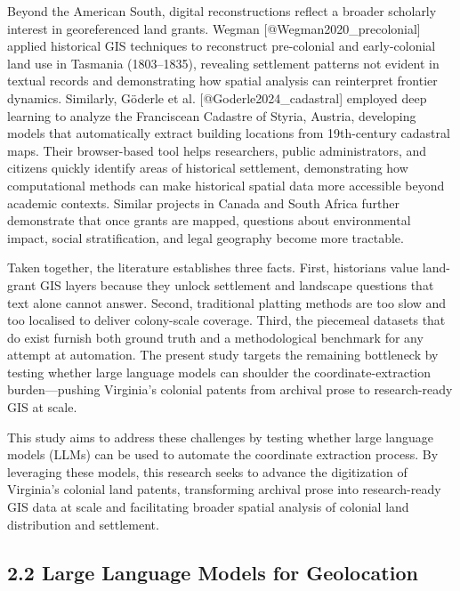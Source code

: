 \documentclass[
  11pt,
]{article}
\begin{document}
Beyond the American South, digital reconstructions reflect a broader
scholarly interest in georeferenced land grants. Wegman
{[}@Wegman2020\_precolonial{]} applied historical GIS techniques to
reconstruct pre-colonial and early-colonial land use in Tasmania
(1803--1835), revealing settlement patterns not evident in textual
records and demonstrating how spatial analysis can reinterpret frontier
dynamics. Similarly, Göderle et al. {[}@Goderle2024\_cadastral{]}
employed deep learning to analyze the Franciscean Cadastre of Styria,
Austria, developing models that automatically extract building locations
from 19th-century cadastral maps. Their browser-based tool helps
researchers, public administrators, and citizens quickly identify areas
of historical settlement, demonstrating how computational methods can
make historical spatial data more accessible beyond academic contexts.
Similar projects in Canada and South Africa further demonstrate that
once grants are mapped, questions about environmental impact, social
stratification, and legal geography become more tractable.

Taken together, the literature establishes three facts. First,
historians value land-grant GIS layers because they unlock settlement
and landscape questions that text alone cannot answer. Second,
traditional platting methods are too slow and too localised to deliver
colony-scale coverage. Third, the piecemeal datasets that do exist
furnish both ground truth and a methodological benchmark for any attempt
at automation. The present study targets the remaining bottleneck by
testing whether large language models can shoulder the
coordinate-extraction burden---pushing Virginia's colonial patents from
archival prose to research-ready GIS at scale.

This study aims to address these challenges by testing whether large
language models (LLMs) can be used to automate the coordinate extraction
process. By leveraging these models, this research seeks to advance the
digitization of Virginia's colonial land patents, transforming archival
prose into research-ready GIS data at scale and facilitating broader
spatial analysis of colonial land distribution and settlement.

\subsection{2.2 Large Language Models for
Geolocation}\label{large-language-models-for-geolocation}
\end{document}
